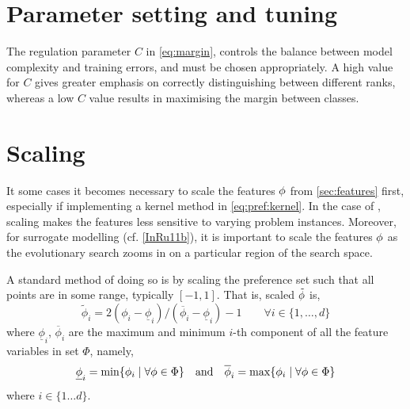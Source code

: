\begin{comment}
\subsection{Kernel functions}
There are several choices for a kernel $\kappa$, e.g., \emph{polynomial kernel},
\begin{eqnarray}
	\kappa_{\text{poly}}(\vec{x}_i,\vec{x}_j)&=& \left(1+\inner{\vec{x}_i}{\vec{x}_j} \right)^p
\end{eqnarray}
of order $p$, or the most commonly used kernel in the literature which implements a Gauss\-ian radial basis function, the \emph{rbf kernel},
\begin{eqnarray}
	\kappa_{\text{rbf}}(\vec{x}_i,\vec{x}_j)&=& e^{-\gamma \norm{\vec{x}_i-\vec{x}_j}^2}
\end{eqnarray}
for $\gamma>0$.
\end{comment}

\section{Parameter setting and tuning}
The regulation parameter $C$ in \cref{eq:margin}, controls the balance between model complexity and training errors, and must be chosen appropriately. A high value for $C$ gives greater emphasis on correctly distinguishing between different ranks, whereas a low $C$ value results in maximising the margin between classes.

\section{Scaling}\label{app:feat:scaling}
It some cases it becomes necessary to scale the features ${\mathbf{\phi}}$ from 
\cref{sec:features} first, especially if implementing a kernel method in 
\cref{eq:pref:kernel}.
In the case of \JSP, scaling makes the features less sensitive to varying 
problem instances.
Moreover, for surrogate modelling (cf. \cref{InRu11b}), it is important to 
scale the features ${\mathbf{\phi}}$ as the evolutionary search zooms in on a particular 
region of the search space. 

A standard method of doing so is by scaling the preference set such that all 
points are in some range, typically $[-1,1]$. That is, scaled $\tilde{{\mathbf{\phi}}}$ 
is,
\begin{equation}\label{eq:scale}
\tilde{\phi}_i = 2 (\phi_i - \underline{\phi}_i) / (\overline{\phi}_i - 
\underline{\phi}_i) - 1 
\quad\quad \forall i\in\{1,\ldots,d\}
\end{equation}
where $\underline{\phi}_i$, $\overline{\phi}_i$ are the maximum and minimum 
$i$-th component of all the feature variables in set $\Phi$, namely,
\begin{equation}
\underline{\phi}_i=\min\{\phi_i\;|\;\forall{\mathbf{\phi}}\in \Phi\} 
\quad\textrm{and}\quad \overline{\phi}_i=\max\{\phi_i\;|\;\forall{\mathbf{\phi}}\in 
\Phi\}
\end{equation}
where $i\in\{1\ldots d\}$. 

